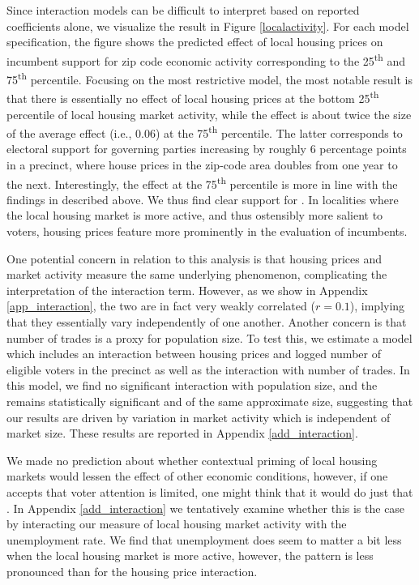 \documentclass[12pt,a4paper]{article}
\begin{document}
	Since interaction models can be difficult to interpret based on reported coefficients alone, we visualize the result in Figure \ref{localactivity}. For each model specification, the figure shows the predicted effect of local housing prices on incumbent support for zip code economic activity corresponding to the 25\textsuperscript{th} and 75\textsuperscript{th} percentile. Focusing on the most restrictive model, the most notable result is that there is essentially no effect of local housing prices at the bottom 25\textsuperscript{th} percentile of local housing market activity, while the effect is about twice the size of the average effect  (i.e., 0.06) at the 75\textsuperscript{th} percentile. The latter corresponds to electoral support for governing parties increasing by roughly 6 percentage points in a precinct, where house prices in the zip-code area doubles from one year to the next. Interestingly, the effect at the 75\textsuperscript{th} percentile is more in line with the findings in \citep{healy2017presidential} described above. We thus find clear support for \htwo. In localities where the local housing market is more active, and thus ostensibly more salient to voters, housing prices feature more prominently in the evaluation of incumbents. 
	
	One potential concern in relation to this analysis is that housing prices and market activity measure the same underlying phenomenon, complicating the interpretation of the interaction term. However, as we show in Appendix \ref{app_interaction}, the two are in fact very weakly correlated ($r=0.1$), implying that they essentially vary independently of one another. Another concern is that number of trades is a proxy for population size. To test this, we estimate a model which includes an interaction between housing prices and logged number of eligible voters in the precinct as well as the interaction with number of trades. In this model, we find no significant interaction with population size, and the remains statistically significant and of the same approximate size, suggesting that our results are driven by variation in market activity which is independent of market size. These results are reported in Appendix \ref{add_interaction}.
	
	We made no prediction about whether contextual priming of local housing markets would lessen the effect of other economic conditions, however, if one accepts that voter attention is limited, one might think that it would do just that \citep[this is a common assertion in the broader priming literature, see for instance][]{krosnick1990altering}. In Appendix \ref{add_interaction} we tentatively examine whether this is the case by interacting our measure of local housing market activity with the unemployment rate. We find that unemployment does seem to matter a bit less when the local housing market is more active, however, the pattern is less pronounced than for the housing price interaction.  
	
\end{document}
